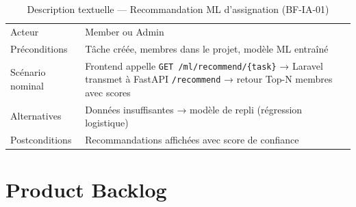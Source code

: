 \begin{table}[H]
  \centering
  \caption{Description textuelle — Recommandation ML d'assignation (BF-IA-01)}
  \label{tab:uc_ml}
  \begin{tabularx}{\textwidth}{L{3cm}X}
    \toprule
     &  \\
    \midrule
    Acteur           & Member ou Admin \\
    Préconditions    & Tâche créée, membres dans le projet, modèle ML entraîné \\
    Scénario nominal & Frontend appelle \texttt{GET /ml/recommend/\{task\}} →
                       Laravel transmet à FastAPI \texttt{/recommend} →
                       retour Top-N membres avec scores \\
    Alternatives     & Données insuffisantes → modèle de repli (régression
                       logistique) \\
    Postconditions   & Recommandations affichées avec score de confiance \\
    \bottomrule
  \end{tabularx}
\end{table}

\section{Product Backlog}

